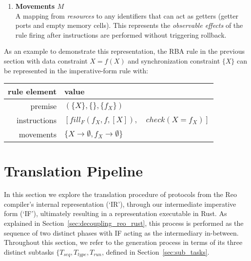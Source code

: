 \begin{enumerate}
	\item \textbf{Movements $M$}\\
	A mapping from \textit{resources} to any identifiers that can act as getters (getter ports and empty memory cells). This represents the \textit{observable effects} of the rule firing after instructions are performed without triggering rollback. 
\end{enumerate}

As an example to demonstrate this representation, the RBA rule in the previous section with data constraint $X=f(X)$
and synchronization constraint $\{X\}$ can be represented in the imperative-form rule with:

\noindent{}
\begin{tabular}{r|l}
	rule element	&  value \\ \hline
	premise	&  $(\{X\}, \{\}, \{f_X\})$ \\
	instructions	& $[fill_F(f_X, f, [X]), \quad{} check(X = f_X)]$ \\
	movements	& $\{X \rightarrow{}\emptyset{}, f_X \rightarrow{}\emptyset{}\}$ 
\end{tabular}
\vspace{1em}

\section{Translation Pipeline}
In this section we explore the translation procedure of protocols from the Reo compiler's internal representation (`IR'), through our intermediate imperative form (`IF'), ultimately resulting in a representation executable in Rust. As explained in Section~\ref{sec:decoupling_reo_rust}, this process is performed as the sequence of two distinct phases with IF acting as the intermediary in-between. Throughout this section, we refer to the generation process in terms of its three distinct subtasks $\{T_{seq}, T_{type}, T_{run}$, defined in Section~\ref{sec:sub_tasks}.

